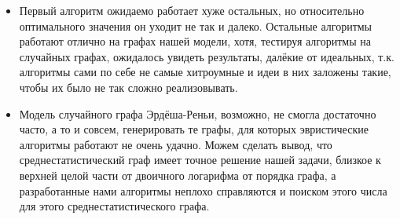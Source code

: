 \begin{itemize}
    \item Первый алгоритм ожидаемо работает хуже остальных, но относительно оптимального значения он уходит не так и далеко. Остальные алгоритмы работают отлично на графах нашей модели, хотя, тестируя алгоритмы на случайных графах, ожидалось увидеть результаты, далёкие от идеальных, т.к. алгоритмы сами по себе не самые хитроумные и идеи в них заложены такие, чтобы их было не так сложно реализовывать.

    \item Модель случайного графа Эрдёша-Реньи, возможно, не смогла достаточно часто, а то и совсем, генерировать те графы, для которых эвристические алгоритмы работают не очень удачно. Можем сделать вывод, что среднестатистический граф имеет точное решение нашей задачи, близкое к верхней целой части от двоичного логарифма от порядка графа, а разработанные нами алгоритмы неплохо справляются и поиском этого числа для этого среднестатистического графа.
\end{itemize}
